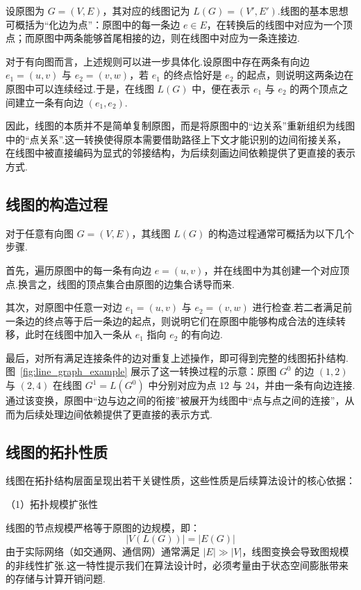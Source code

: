设原图为 $G=(V,E)$，其对应的线图记为 $L(G)=(V',E')$\cite{whitney1932congruent}.线图的基本思想可概括为“化边为点”：原图中的每一条边 $e\in E$，在转换后的线图中对应为一个顶点；而原图中两条能够首尾相接的边，则在线图中对应为一条连接边.

对于有向图而言，上述规则可以进一步具体化\cite{harary1960some}.设原图中存在两条有向边 $e_1=(u,v)$ 与 $e_2=(v,w)$，若 $e_1$ 的终点恰好是 $e_2$ 的起点，则说明这两条边在原图中可以连续经过.于是，在线图 $L(G)$ 中，便在表示 $e_1$ 与 $e_2$ 的两个顶点之间建立一条有向边 $(e_1,e_2)$.

因此，线图的本质并不是简单复制原图，而是将原图中的“边关系”重新组织为线图中的“点关系”.这一转换使得原本需要借助路径上下文才能识别的边间衔接关系，在线图中被直接编码为显式的邻接结构，为后续刻画边间依赖提供了更直接的表示方式.

\subsection{线图的构造过程}

对于任意有向图 $G=(V,E)$，其线图 $L(G)$ 的构造过程通常可概括为以下几个步骤.

首先，遍历原图中的每一条有向边 $e=(u,v)$，并在线图中为其创建一个对应顶点.换言之，线图的顶点集合由原图的边集合诱导而来.

其次，对原图中任意一对边 $e_1=(u,v)$ 与 $e_2=(v,w)$ 进行检查.若二者满足前一条边的终点等于后一条边的起点，则说明它们在原图中能够构成合法的连续转移，此时在线图中加入一条从 $e_1$ 指向 $e_2$ 的有向边.

最后，对所有满足连接条件的边对重复上述操作，即可得到完整的线图拓扑结构.图~\ref{fig:line_graph_example} 展示了这一转换过程的示意：原图 $G^0$ 的边 $(1,2)$ 与 $(2,4)$ 在线图 $G^1=L(G^0)$ 中分别对应为点 $12$ 与 $24$，并由一条有向边连接.通过该变换，原图中“边与边之间的衔接”被展开为线图中“点与点之间的连接”，从而为后续处理边间依赖提供了更直接的表示方式.



\subsection{线图的拓扑性质}

线图在拓扑结构层面呈现出若干关键性质，这些性质是后续算法设计的核心依据：

（1）拓扑规模扩张性

线图的节点规模严格等于原图的边规模，即：
$$ |V(L(G))| = |E(G)| $$ 
由于实际网络（如交通网、通信网）通常满足 $|E| \gg |V|$，线图变换会导致图规模的非线性扩张.这一特性提示我们在算法设计时，必须考量由于状态空间膨胀带来的存储与计算开销问题.

